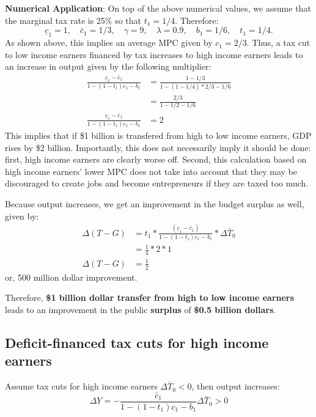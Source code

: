 \documentclass[]{book}
\theoremstyle{definition}
\theoremstyle{definition}
\theoremstyle{definition}
\theoremstyle{remark}
\begin{document}
\textbf{Numerical Application}: On top of the above numerical values, we
assume that the marginal tax rate is 25\% so that \(t_1=1/4\).
Therefore:
\[\underline{c}_{1}=1, \quad \bar{c}_{1}=1/3,\quad \gamma=9, \quad\lambda=0.9,\quad b_1=1/6, \quad t_1=1/4.\]
As shown above, this implies an average MPC given by \(c_1=2/3.\) Thus,
a tax cut to low income earners financed by tax increases to high income
earners leads to an increase in output given by the following
multiplier: \[
\begin{aligned}
\frac{\underline{c}_{1}-\bar{c}_{1}}{1-(1-t_1)c_{1}-b_{1}} &= \frac{1-1/3}{1-(1-1/4)*2/3-1/6}\\
&= \frac{2/3}{1-1/2-1/6}\\
\frac{\underline{c}_{1}-\bar{c}_{1}}{1-(1-t_1)c_{1}-b_{1}} &=2
\end{aligned}
\] This implies that if \$1 billion is transfered from high to low
income earners, GDP rises by \$2 billion. Importantly, this does not
necessarily imply it should be done: first, high income earners are
clearly worse off. Second, this calculation based on high income
earners' lower MPC does not take into account that they may be
discouraged to create jobs and become entrepreneurs if they are taxed
too much.

Because output increases, we get an improvement in the budget surplus as
well, given by: \[
\begin{aligned}
\Delta\left(T-G\right)&=t_1*\frac{\left(\underline{c}_{1}-\bar{c}_{1}\right)}{1-\left(1-t_{1}\right)c_{1}-b_{1}}*\Delta\bar{T}_{0}\\
&=\frac{1}{4}*2*1\\
\Delta\left(T-G\right)&=\frac{1}{2}
\end{aligned}
\] or, 500 million dollar improvement.

Therefore, \textbf{\$1 billion dollar transfer from high to low income
earners} leads to an improvement in the public \textbf{surplus} of
\textbf{\$0.5 billion dollars}.

\subsection{Deficit-financed tax cuts for high income
earners}\label{deficit-financed-tax-cuts-for-high-income-earners}

Assume tax cuts for high income earners \(\Delta\bar{T}_{0}<0\), then
output increases:
\[\Delta Y=-\frac{\bar{c}_{1}}{1-\left(1-t_{1}\right)c_{1}-b_{1}}\Delta\bar{T}_{0}>0\]
\end{document}
